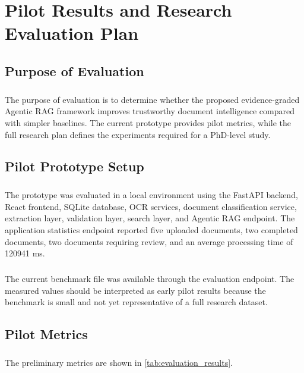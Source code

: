 \chapter{Pilot Results and Research Evaluation Plan}
\label{chap:experiments_and_results}

\section{Purpose of Evaluation}
\paragraph{} The purpose of evaluation is to determine whether the proposed evidence-graded Agentic RAG framework improves trustworthy document intelligence compared with simpler baselines. The current prototype provides pilot metrics, while the full research plan defines the experiments required for a PhD-level study.

\section{Pilot Prototype Setup}
\paragraph{} The prototype was evaluated in a local environment using the FastAPI backend, React frontend, SQLite database, OCR services, document classification service, extraction layer, validation layer, search layer, and Agentic RAG endpoint. The application statistics endpoint reported five uploaded documents, two completed documents, two documents requiring review, and an average processing time of 120941 ms.

\paragraph{} The current benchmark file was available through the evaluation endpoint. The measured values should be interpreted as early pilot results because the benchmark is small and not yet representative of a full research dataset.

\section{Pilot Metrics}
\paragraph{} The preliminary metrics are shown in \cref{tab:evaluation_results}.

